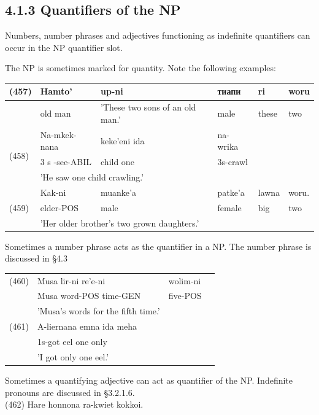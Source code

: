 \documentclass[10pt]{article}
\begin{document}
\subsection*{4.1.3 Quantifiers of the NP}
Numbers, number phrases and adjectives functioning as indefinite quantifiers can occur in the NP quantifier slot.

The NP is sometimes marked for quantity. Note the following examples:

\begin{center}
\begin{tabular}{|l|l|l|l|l|l|}
\hline
\multirow[t]{2}{*}{(457)} & Hamto' & up-ni & тиапи & ri & woru \\
\hline
 & old man & 'These two sons of an old man.' & male & these & two \\
\hline
\multirow[t]{3}{*}{(458)} & Na-mkek-nana & keke'eni ida & na-wrika &  &  \\
\hline
 & 3 s -see-ABIL & child one & 3s-crawl &  &  \\
\hline
 & \multicolumn{5}{|l|}{'He saw one child crawling.'} \\
\hline
\multirow[t]{3}{*}{(459)} & Kak-ni & muanke'a & patke'a & lawna & woru. \\
\hline
 & elder-POS & male & female & big & two \\
\hline
 & \multicolumn{3}{|l|}{'Her older brother's two grown daughters.'} &  &  \\
\hline
\end{tabular}
\end{center}

Sometimes a number phrase acts as the quantifier in a NP. The number phrase is discussed in §4.3

\begin{center}
\begin{tabular}{llll}
(460) & Musa lir-ni re'e-ni & wolim-ni \\
 & Musa word-POS time-GEN & five-POS \\
 & 'Musa's words for the fifth time.' &  \\
(461) & A-liernana emna ida meha &  \\
 & 1s-got eel one only &  \\
 & 'I got only one eel.' &  \\
\end{tabular}
\end{center}

Sometimes a quantifying adjective can act as quantifier of the NP. Indefinite pronouns are discussed in §3.2.1.6.\\
(462) Hare honnona ra-kwiet kokkoi.
\end{document}
